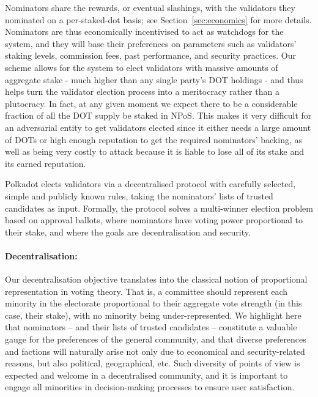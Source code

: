 Nominators share the rewards, or eventual slashings, with the validators they nominated on a per-staked-dot basis; 
see Section~\ref{sec:economics} for more details. 
Nominators are thus economically incentivised to act as watchdogs for the system, and they will base their preferences 
on parameters such as validators' staking levels, commission fees, past performance, and security practices.
Our scheme allows for the system to elect validators with massive amounts of aggregate stake
- much higher than any single party's DOT holdings -
and thus helps turn the validator election process into a meritocracy rather than a plutocracy.
In fact, at any given moment we expect there to be a considerable fraction of all the DOT supply be staked in NPoS.
This makes it very difficult for an adversarial entity to get validators elected since it either needs a large amount of DOTs or high enough reputation to get the required nominators' backing,
 as well as being very costly to attack because it is liable to lose all of its stake and its earned reputation.

Polkadot elects validators via a decentralised protocol with carefully selected, simple and publicly known rules,
taking the nominators' lists of trusted candidates as input. Formally, the protocol solves a multi-winner election
problem based on approval ballots, where nominators have voting power proportional to their stake,
and where the goals are decentralisation and security.

\paragraph{Decentralisation:}  
Our decentralisation objective translates into the classical notion of proportional representation in voting theory.
That is, a committee should represent each minority in the electorate proportional to their aggregate vote strength (in this case, their stake), with no minority being under-represented. 
We highlight here that nominators -- and their lists of trusted candidates -- constitute a valuable gauge for the preferences of the general community, and that diverse preferences and factions will naturally arise not only due to economical and security-related reasons, but also political, geographical, etc. Such diversity of points of view is expected and welcome in a decentralised community, and it is important to engage all minorities in decision-making processes to ensure user satisfaction. 


